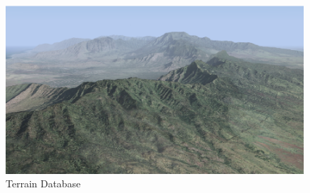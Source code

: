 \begin{figure}
  \centering
  \includegraphics[width=120mm]{images/vpb_scenery_04.eps}
  \caption{Terrain Database}
\end{figure}
